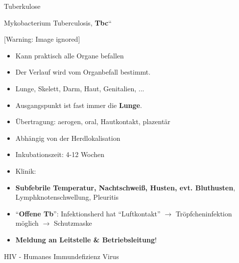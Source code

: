 \documentclass{article}
\newcommand\gEs[1]{\textbf{\textcolor[rgb]{0.0,0.0,0.5019608}{#1}}}
\newcommand\gEs[1]{\textbf{\textcolor[rgb]{0.0,0.0,0.5019608}{#1}}}
\newcommand\gT[1]{\textbf{\textup{\textcolor[rgb]{0.0,0.5019608,0.0}{#1}}}}
\newcommand\gZ[1]{\textcolor[rgb]{0.5019608,0.5019608,0.5019608}{#1}}
\begin{document}
{\mdseries\color[rgb]{0.0,0.0,0.5019608}
Tuberkulose }

{\mdseries
\gZ{Mykobacterium Tuberculosis},
{\quotedblbase}\gT{Tbc}{\textquotedblleft}}

\begin{center}
 [Warning: Image ignored] %

\end{center}
\begin{itemize}
\item {\mdseries
Kann praktisch alle Organe befallen }

\item {\mdseries
Der Verlauf wird vom Organbefall bestimmt.}

\end{itemize}
\begin{itemize}
\item {\mdseries
Lunge, Skelett, Darm, Haut, Genitalien, ...}

\end{itemize}
\begin{itemize}
\item {\mdseries
Ausgangspunkt ist fast immer die \gEs{Lunge}.}

\item {\mdseries
\"Ubertragung: aerogen, oral, Hautkontakt, plazent\"ar}

\end{itemize}
\begin{itemize}
\item {\mdseries
Abh\"angig von der Herdlokalisation}

\end{itemize}
\begin{itemize}
\item {\mdseries
Inkubationszeit: 4-12 Wochen}

\item {\mdseries
Klinik:}

\end{itemize}
\begin{itemize}
\item {\mdseries
\gEs{Subfebrile Temperatur, Nachtschwei{\ss}, Husten,
evt. Bluthusten}, Lymphknotenschwellung,  Pleuritis}

\end{itemize}
\begin{itemize}
\item {\mdseries
{\textquotedblleft}\gT{Offene
Tb}{\textquotedblright}: Infektionsherd hat
{\textquotedblleft}Luftkontakt{\textquotedblright} ${\rightarrow}$
Tr\"opfcheninfektion m\"oglich ${\rightarrow}$ Schutzmaske}

\item {\mdseries
\gEs{Meldung an Leitstelle \& Betriebsleitung}!}

\end{itemize}
{\mdseries\color[rgb]{0.0,0.0,0.5019608}
HIV - Humanes
Immundefizienz Virus}
\end{document}
